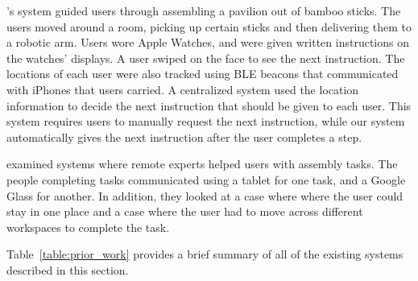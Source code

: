 \citet{robotic_arm}'s system guided users through assembling a pavilion out of
bamboo sticks. The users moved around a room, picking up certain sticks and
then delivering them to a robotic arm. Users wore Apple Watches, and were given
written instructions on the watches' displays. A user swiped on the face to see
the next instruction. The locations of each user were also tracked using BLE
beacons that communicated with iPhones that users carried. A centralized system
used the location information to decide the next instruction that should be
given to each user.
This system requires users to manually request the next instruction, while our
system automatically gives the next instruction after the user completes a step.

\citet{collaboration} examined systems where remote experts helped users with
assembly tasks. The people completing tasks communicated using a tablet for one
task, and a Google Glass for another. In addition,
they looked at a case where where the user could stay in one place and a case
where the user had to move across different workspaces to complete the task.

Table~\ref{table:prior_work} provides a brief summary of all of the existing
systems described in this section.

